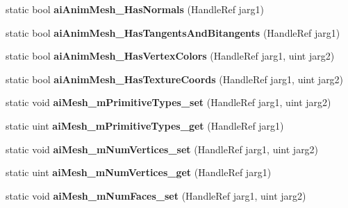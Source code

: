 \begin{DoxyCompactItemize}
\item 
\hypertarget{class_assimp_p_i_n_v_o_k_e_a8fac9757c39a41fda9315d9c4bf1ec9b}{static bool {\bfseries ai\+Anim\+Mesh\+\_\+\+Has\+Normals} (Handle\+Ref jarg1)}\label{class_assimp_p_i_n_v_o_k_e_a8fac9757c39a41fda9315d9c4bf1ec9b}

\item 
\hypertarget{class_assimp_p_i_n_v_o_k_e_a7ac5f93a07e4391abfb724ce6cdabed0}{static bool {\bfseries ai\+Anim\+Mesh\+\_\+\+Has\+Tangents\+And\+Bitangents} (Handle\+Ref jarg1)}\label{class_assimp_p_i_n_v_o_k_e_a7ac5f93a07e4391abfb724ce6cdabed0}

\item 
\hypertarget{class_assimp_p_i_n_v_o_k_e_a85c19404765f24709786567ff40e9bfd}{static bool {\bfseries ai\+Anim\+Mesh\+\_\+\+Has\+Vertex\+Colors} (Handle\+Ref jarg1, uint jarg2)}\label{class_assimp_p_i_n_v_o_k_e_a85c19404765f24709786567ff40e9bfd}

\item 
\hypertarget{class_assimp_p_i_n_v_o_k_e_a330ae56efbc542768b002fb0b96ed690}{static bool {\bfseries ai\+Anim\+Mesh\+\_\+\+Has\+Texture\+Coords} (Handle\+Ref jarg1, uint jarg2)}\label{class_assimp_p_i_n_v_o_k_e_a330ae56efbc542768b002fb0b96ed690}

\item 
\hypertarget{class_assimp_p_i_n_v_o_k_e_a05fce11dd7c025d963548e9fda061577}{static void {\bfseries ai\+Mesh\+\_\+m\+Primitive\+Types\+\_\+set} (Handle\+Ref jarg1, uint jarg2)}\label{class_assimp_p_i_n_v_o_k_e_a05fce11dd7c025d963548e9fda061577}

\item 
\hypertarget{class_assimp_p_i_n_v_o_k_e_a532bb2d743aa4223a0edc111a0bd6564}{static uint {\bfseries ai\+Mesh\+\_\+m\+Primitive\+Types\+\_\+get} (Handle\+Ref jarg1)}\label{class_assimp_p_i_n_v_o_k_e_a532bb2d743aa4223a0edc111a0bd6564}

\item 
\hypertarget{class_assimp_p_i_n_v_o_k_e_a2b265d2cc9be894f1f8de831d173e80c}{static void {\bfseries ai\+Mesh\+\_\+m\+Num\+Vertices\+\_\+set} (Handle\+Ref jarg1, uint jarg2)}\label{class_assimp_p_i_n_v_o_k_e_a2b265d2cc9be894f1f8de831d173e80c}

\item 
\hypertarget{class_assimp_p_i_n_v_o_k_e_ab8e233ad54b15d5446aa921b8a6e490c}{static uint {\bfseries ai\+Mesh\+\_\+m\+Num\+Vertices\+\_\+get} (Handle\+Ref jarg1)}\label{class_assimp_p_i_n_v_o_k_e_ab8e233ad54b15d5446aa921b8a6e490c}

\item 
\hypertarget{class_assimp_p_i_n_v_o_k_e_a400415c6b4ea6230e287c23ca4262467}{static void {\bfseries ai\+Mesh\+\_\+m\+Num\+Faces\+\_\+set} (Handle\+Ref jarg1, uint jarg2)}\label{class_assimp_p_i_n_v_o_k_e_a400415c6b4ea6230e287c23ca4262467}


\end{DoxyCompactItemize}
